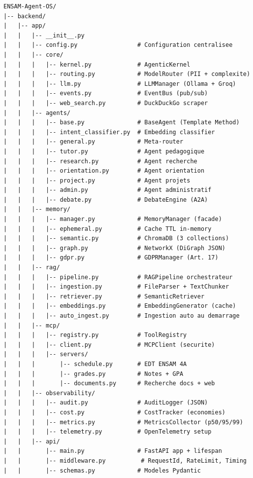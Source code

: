 \documentclass[12pt, a4paper]{article}
\begin{document}
\begin{lstlisting}[style=jsonstyle, caption={Arborescence complète du projet}, label={lst:full_tree}]
ENSAM-Agent-OS/
|-- backend/
|   |-- app/
|   |   |-- __init__.py
|   |   |-- config.py                 # Configuration centralisee
|   |   |-- core/
|   |   |   |-- kernel.py             # AgenticKernel
|   |   |   |-- routing.py            # ModelRouter (PII + complexite)
|   |   |   |-- llm.py                # LLMManager (Ollama + Groq)
|   |   |   |-- events.py             # EventBus (pub/sub)
|   |   |   |-- web_search.py         # DuckDuckGo scraper
|   |   |-- agents/
|   |   |   |-- base.py               # BaseAgent (Template Method)
|   |   |   |-- intent_classifier.py  # Embedding classifier
|   |   |   |-- general.py            # Meta-router
|   |   |   |-- tutor.py              # Agent pedagogique
|   |   |   |-- research.py           # Agent recherche
|   |   |   |-- orientation.py        # Agent orientation
|   |   |   |-- project.py            # Agent projets
|   |   |   |-- admin.py              # Agent administratif
|   |   |   |-- debate.py             # DebateEngine (A2A)
|   |   |-- memory/
|   |   |   |-- manager.py            # MemoryManager (facade)
|   |   |   |-- ephemeral.py          # Cache TTL in-memory
|   |   |   |-- semantic.py           # ChromaDB (3 collections)
|   |   |   |-- graph.py              # NetworkX (DiGraph JSON)
|   |   |   |-- gdpr.py               # GDPRManager (Art. 17)
|   |   |-- rag/
|   |   |   |-- pipeline.py           # RAGPipeline orchestrateur
|   |   |   |-- ingestion.py          # FileParser + TextChunker
|   |   |   |-- retriever.py          # SemanticRetriever
|   |   |   |-- embeddings.py         # EmbeddingGenerator (cache)
|   |   |   |-- auto_ingest.py        # Ingestion auto au demarrage
|   |   |-- mcp/
|   |   |   |-- registry.py           # ToolRegistry
|   |   |   |-- client.py             # MCPClient (securite)
|   |   |   |-- servers/
|   |   |       |-- schedule.py       # EDT ENSAM 4A
|   |   |       |-- grades.py         # Notes + GPA
|   |   |       |-- documents.py      # Recherche docs + web
|   |   |-- observability/
|   |   |   |-- audit.py              # AuditLogger (JSON)
|   |   |   |-- cost.py               # CostTracker (economies)
|   |   |   |-- metrics.py            # MetricsCollector (p50/95/99)
|   |   |   |-- telemetry.py          # OpenTelemetry setup
|   |   |-- api/
|   |       |-- main.py               # FastAPI app + lifespan
|   |       |-- middleware.py          # RequestId, RateLimit, Timing
|   |       |-- schemas.py            # Modeles Pydantic

\end{lstlisting}
\end{document}
